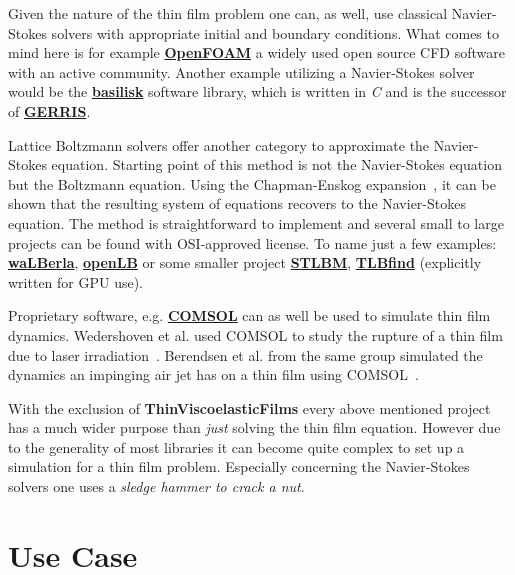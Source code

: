 Given the nature of the thin film problem one can, as well, use classical Navier-Stokes solvers with appropriate initial and boundary conditions.
What comes to mind here is for example \href{https://www.openfoam.com/}{\textbf{OpenFOAM}} a widely used open source CFD software with an active community.
Another example utilizing a Navier-Stokes solver would be the \href{http://basilisk.fr}{\textbf{basilisk}} software library, which is written in \textit{C} and is the successor of \href{http://gfs.sourceforge.net/wiki/index.php/Main_Page}{\textbf{GERRIS}}.

Lattice Boltzmann solvers offer another category to approximate the Navier-Stokes equation.
Starting point of this method is not the Navier-Stokes equation but the Boltzmann equation.
Using the Chapman-Enskog expansion~\cite{Chapman, Enskog}, it can be shown that the resulting system of equations recovers to the Navier-Stokes equation.
The method is straightforward to implement and several small to large projects can be found with OSI-approved license. 
To name just a few examples: \href{https://walberla.net/doxygen/index.html}{\textbf{waLBerla}}, \href{https://www.openlb.net/}{\textbf{openLB}} or some smaller project \href{https://gitlab.com/unigehpfs/stlbm}{\textbf{STLBM}}, \href{https://github.com/FrancescaPelusi/TLBfind}{\textbf{TLBfind}} (explicitly written for GPU use).

Proprietary software, e.g. \href{https://www.comsol.com/}{\textbf{COMSOL}} can as well be used to simulate thin film dynamics.
Wedershoven et al. used COMSOL to study the rupture of a thin film due to laser irradiation~\cite{doi:10.1063/1.4863318}.
Berendsen et al. from the same group simulated the dynamics an impinging air jet has on a thin film using COMSOL~\cite{doi:10.1021/la301353f}.

With the exclusion of \textbf{ThinViscoelasticFilms} every above mentioned project has a much wider purpose than \textit{just} solving the thin film equation.
However due to the generality of most libraries it can become quite complex to set up a simulation for a thin film problem.
Especially concerning the Navier-Stokes solvers one uses a \textit{sledge hammer to crack a nut}.

\section{Use Case}


